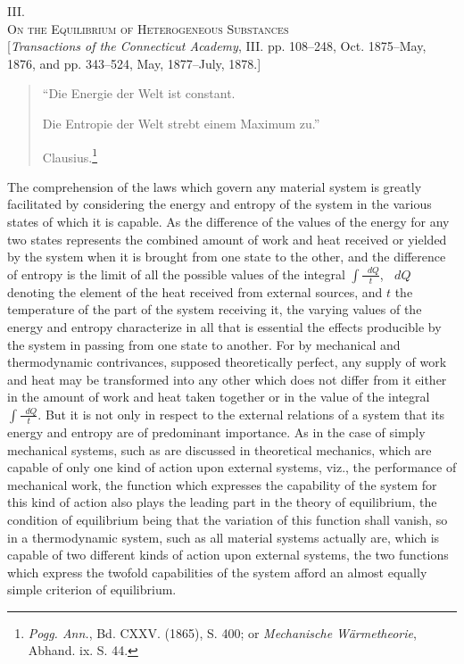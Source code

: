 \documentclass[11pt]{article}
\newcommand{\dd}{\mathop{}\!d}
\begin{document}
\begin{center}
{\Large III.}\\[0.5em]
{\Large\scshape On the Equilibrium of Heterogeneous Substances}\\[0.5em]
{\small [\textit{Transactions of the Connecticut Academy}, III. pp. 108--248, Oct. 1875--May, 1876, and pp. 343--524, May, 1877--July, 1878.]}
\end{center}

\begin{quote}
``Die Energie der Welt ist constant.

Die Entropie der Welt strebt einem Maximum zu.''\par
\hfill Clausius.\footnote{\textit{Pogg. Ann.}, Bd. CXXV. (1865), S. 400; or \textit{Mechanische Wärmetheorie}, Abhand. ix. S. 44.}
\end{quote}

The comprehension of the laws which govern any material system is greatly facilitated by considering the energy and entropy of the system in the various states of which it is capable. As the difference of the values of the energy for any two states represents the combined amount of work and heat received or yielded by the system when it is brought from one state to the other, and the difference of entropy is the limit of all the possible values of the integral \(\int \frac{\dd Q}{t}\), \(\dd Q\) denoting the element of the heat received from external sources, and \(t\) the temperature of the part of the system receiving it, the varying values of the energy and entropy characterize in all that is essential the effects producible by the system in passing from one state to another. For by mechanical and thermodynamic contrivances, supposed theoretically perfect, any supply of work and heat may be transformed into any other which does not differ from it either in the amount of work and heat taken together or in the value of the integral \(\int\frac{\dd Q}{t}\). But it is not only in respect to the external relations of a system that its energy and entropy are of predominant importance. As in the case of simply mechanical systems, such as are discussed in theoretical mechanics, which are capable of only one kind of action upon external systems, viz., the performance of mechanical work, the function which expresses the capability of the system for this kind of action also plays the leading part in the theory of equilibrium, the condition of equilibrium being that the variation of this function shall vanish, so in a thermodynamic system, such as all material systems actually are, which is capable of two different kinds of action upon external systems, the two functions which express the twofold capabilities of the system afford an almost equally simple criterion of equilibrium.
\end{document}
